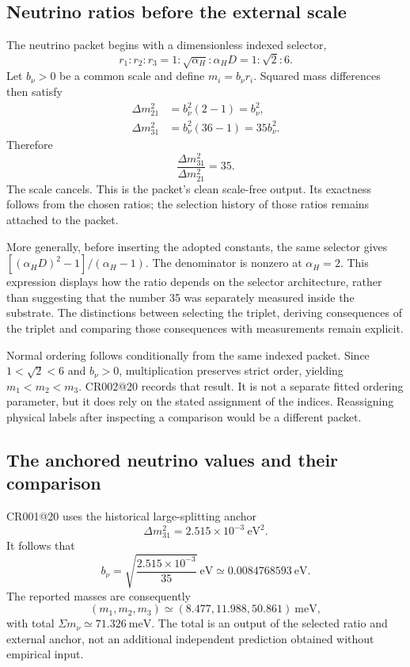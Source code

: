 \subsection{Neutrino ratios before the external scale}

The neutrino packet begins with a dimensionless indexed selector,
\begin{equation}
r_1:r_2:r_3=1:\sqrt{\alpha_H}:\alpha_HD=1:\sqrt2:6.
\label{v2c3:nuratio}
\end{equation}
Let $b_\nu>0$ be a common scale and define $m_i=b_\nu r_i$. Squared mass differences then satisfy
\begin{align}
\Delta m_{21}^2&=b_\nu^2(2-1)=b_\nu^2,\\
\Delta m_{31}^2&=b_\nu^2(36-1)=35b_\nu^2.
\end{align}
Therefore
\begin{equation}
\frac{\Delta m_{31}^2}{\Delta m_{21}^2}=35.
\label{v2c3:nusplit}
\end{equation}
The scale cancels. This is the packet's clean scale-free output. Its exactness follows from the chosen ratios; the selection history of those ratios remains attached to the packet.

More generally, before inserting the adopted constants, the same selector gives $[(\alpha_HD)^2-1]/(\alpha_H-1)$. The denominator is nonzero at $\alpha_H=2$. This expression displays how the ratio depends on the selector architecture, rather than suggesting that the number 35 was separately measured inside the substrate. The distinctions between selecting the triplet, deriving consequences of the triplet and comparing those consequences with measurements remain explicit.

Normal ordering follows conditionally from the same indexed packet. Since $1<\sqrt2<6$ and $b_\nu>0$, multiplication preserves strict order, yielding $m_1<m_2<m_3$. CR002@20 records that result. It is not a separate fitted ordering parameter, but it does rely on the stated assignment of the indices. Reassigning physical labels after inspecting a comparison would be a different packet.

\subsection{The anchored neutrino values and their comparison}

CR001@20 uses the historical large-splitting anchor
\begin{equation}
\Delta m_{31}^2=2.515\times10^{-3}\ \mathrm{eV}^2.
\end{equation}
It follows that
\begin{equation}
b_\nu=\sqrt{\frac{2.515\times10^{-3}}{35}}\ \mathrm{eV}
\simeq0.0084768593\ \mathrm{eV}.
\end{equation}
The reported masses are consequently
\begin{equation}
(m_1,m_2,m_3)\simeq(8.477,11.988,50.861)\ \mathrm{meV},
\end{equation}
with total $\Sigma m_\nu\simeq71.326\ \mathrm{meV}$. The total is an output of the selected ratio and external anchor, not an additional independent prediction obtained without empirical input.

